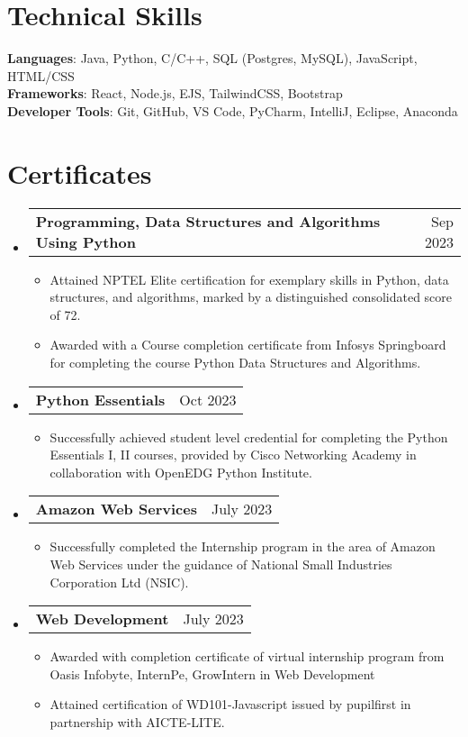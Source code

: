 \documentclass[letterpaper,11pt]{article}
\makeatletter
\newcommand{\resumeItem}[1]{
  \item\small{
    {#1 \vspace{-2pt}}
  }
}
\newcommand{\resumeProjectHeading}[2]{
    \item
    \begin{tabular*}{0.97\textwidth}{l@{\extracolsep{\fill}}r}
      \small#1 & #2 \\
    \end{tabular*}\vspace{-7pt}
}
\newcommand{\resumeSubHeadingListStart}{\begin{itemize}[leftmargin=0.15in, label={}]}
\newcommand{\resumeSubHeadingListEnd}{\end{itemize}}
\newcommand{\resumeItemListStart}{\begin{itemize}}
\newcommand{\resumeItemListEnd}{\end{itemize}\vspace{-5pt}}
\makeatother
\begin{document}
\section{Technical Skills}
 \begin{itemize}[leftmargin=0.15in, label={}]
    \small{\item{
     \textbf{Languages}{: Java, Python, C/C++, SQL (Postgres, MySQL), JavaScript, HTML/CSS} \\
     \textbf{Frameworks}{: React, Node.js, EJS, TailwindCSS, Bootstrap} \\
     \textbf{Developer Tools}{: Git, GitHub, VS Code, PyCharm, IntelliJ, Eclipse, Anaconda} \\
    }}
 \end{itemize}

\section{Certificates}
    \resumeSubHeadingListStart
    \resumeProjectHeading
          {\textbf{Programming, Data Structures and Algorithms Using Python}  \emph{}}{Sep 2023}
        \resumeItemListStart
        \resumeItem{Attained NPTEL Elite certification for exemplary skills in Python, data structures, and algorithms, marked by a distinguished consolidated score of 72.}
        \resumeItem{Awarded with a Course completion certificate from Infosys Springboard for completing the course Python Data Structures and Algorithms.}
    \resumeItemListEnd
    \resumeProjectHeading
          {\textbf{Python Essentials}  \emph{}}{Oct 2023}
        \resumeItemListStart
        \resumeItem{Successfully achieved student level credential for completing the Python Essentials I, II courses, provided by Cisco Networking Academy in collaboration with OpenEDG Python Institute.}
    \resumeItemListEnd
    
    \resumeProjectHeading
          {\textbf{Amazon Web Services}  \emph{}}{July 2023}
        \resumeItemListStart
        \resumeItem{Successfully completed the Internship program in the area of Amazon Web Services under the guidance of National Small Industries Corporation Ltd (NSIC).}
    \resumeItemListEnd
    \resumeProjectHeading
          {\textbf{Web Development}  \emph{}}{July 2023}
        \resumeItemListStart
        \resumeItem{Awarded with completion certificate of virtual internship program from Oasis Infobyte, InternPe, GrowIntern in Web Development}
        \resumeItem{Attained certification of WD101-Javascript issued by pupilfirst in partnership with AICTE-LITE. \emph{}}
    \resumeItemListEnd
    \resumeSubHeadingListEnd
\end{document}
